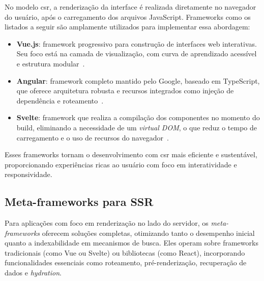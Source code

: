 No modelo \acrshort{csr}, a renderização da interface é realizada diretamente no navegador do usuário, após o carregamento dos arquivos JavaScript. Frameworks como os listados a seguir são amplamente utilizados para implementar essa abordagem:

\begin{itemize}
    \item \textbf{Vue.js}: framework progressivo para construção de interfaces web interativas. Seu foco está na camada de visualização, com curva de aprendizado acessível e estrutura modular~\cite{vue2025}.
    
    \item \textbf{Angular}: framework completo mantido pelo Google, baseado em TypeScript, que oferece arquitetura robusta e recursos integrados como injeção de dependência e roteamento~\cite{angular2025}.
    
    \item \textbf{Svelte}: framework que realiza a compilação dos componentes no momento do build, eliminando a necessidade de um \textit{virtual DOM}, o que reduz o tempo de carregamento e o uso de recursos do navegador~\cite{svelte2025}.
\end{itemize}

Esses frameworks tornam o desenvolvimento com \acrshort{csr} mais eficiente e sustentável, proporcionando experiências ricas ao usuário com foco em interatividade e responsividade.

\subsection{Meta-frameworks para SSR}
\label{subsec:frameworks-ssr}

Para aplicações com foco em renderização no lado do servidor, os \emph{meta-frameworks} oferecem soluções completas, otimizando tanto o desempenho inicial quanto a indexabilidade em mecanismos de busca. Eles operam sobre frameworks tradicionais (como Vue ou Svelte) ou bibliotecas (como React), incorporando funcionalidades essenciais como roteamento, pré-renderização, recuperação de dados e \textit{hydration}.


